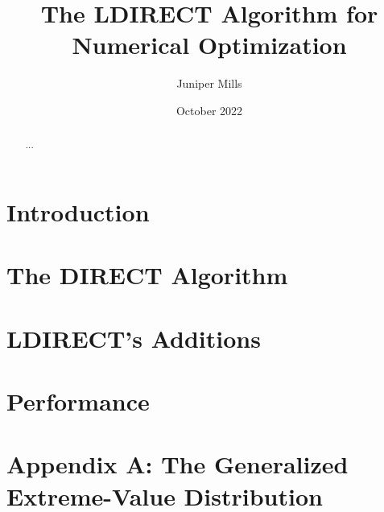 \documentclass[draft]{article}
\begin{document}
    \title{The LDIRECT Algorithm for Numerical Optimization}
    \author{Juniper Mills}
    \date{October 2022}
    \maketitle
    \begin{abstract}
        ...
    \end{abstract}
    \tableofcontents
    \section{Introduction}
    \section{The DIRECT Algorithm}
    \section{LDIRECT's Additions}
    \section{Performance}
    \section{Appendix A: The Generalized Extreme-Value Distribution}
    \begin{thebibliography}{100}
        
    \end{thebibliography}
\end{document}
